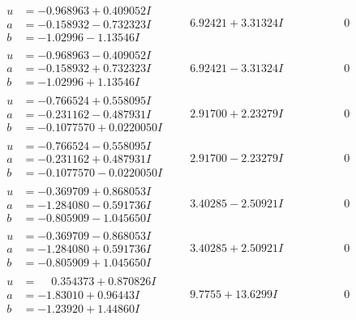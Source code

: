 \documentclass[1p]{elsarticle_modified}
\theoremstyle{definition}
\begin{document}
$$\begin{array}{c|c|c}
\begin{aligned}
u &= -0.968963 + 0.409052 I \\
a &= -0.158932 - 0.732323 I \\
b &= -1.02996 - 1.13546 I\end{aligned}
 & \phantom{-}6.92421 + 3.31324 I & \phantom{-0.000000 } 0 \\ \hline\begin{aligned}
u &= -0.968963 - 0.409052 I \\
a &= -0.158932 + 0.732323 I \\
b &= -1.02996 + 1.13546 I\end{aligned}
 & \phantom{-}6.92421 - 3.31324 I & \phantom{-0.000000 } 0 \\ \hline\begin{aligned}
u &= -0.766524 + 0.558095 I \\
a &= -0.231162 - 0.487931 I \\
b &= -0.1077570 + 0.0220050 I\end{aligned}
 & \phantom{-}2.91700 + 2.23279 I & \phantom{-0.000000 } 0 \\ \hline\begin{aligned}
u &= -0.766524 - 0.558095 I \\
a &= -0.231162 + 0.487931 I \\
b &= -0.1077570 - 0.0220050 I\end{aligned}
 & \phantom{-}2.91700 - 2.23279 I & \phantom{-0.000000 } 0 \\ \hline\begin{aligned}
u &= -0.369709 + 0.868053 I \\
a &= -1.284080 - 0.591736 I \\
b &= -0.805909 - 1.045650 I\end{aligned}
 & \phantom{-}3.40285 - 2.50921 I & \phantom{-0.000000 } 0 \\ \hline\begin{aligned}
u &= -0.369709 - 0.868053 I \\
a &= -1.284080 + 0.591736 I \\
b &= -0.805909 + 1.045650 I\end{aligned}
 & \phantom{-}3.40285 + 2.50921 I & \phantom{-0.000000 } 0 \\ \hline\begin{aligned}
u &= \phantom{-}0.354373 + 0.870826 I \\
a &= -1.83010 + 0.96443 I \\
b &= -1.23920 + 1.44860 I\end{aligned}
 & \phantom{-}9.7755 + 13.6299 I & \phantom{-0.000000 } 0 \\ \hline\begin{aligned}

\end{aligned}
\end{array}$$
\end{document}
